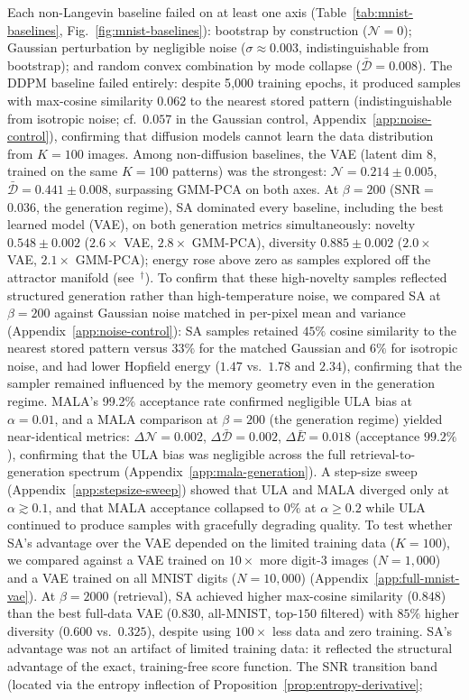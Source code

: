 Each non-Langevin baseline failed on at least one axis (Table~\ref{tab:mnist-baselines}, Fig.~\ref{fig:mnist-baselines}): bootstrap by construction ($\mathcal{N}{=}0$); Gaussian perturbation by negligible noise ($\sigma{\approx}0.003$, indistinguishable from bootstrap); and random convex combination by mode collapse ($\bar{\mathcal{D}}{=}0.008$). The DDPM baseline failed entirely: despite 5{,}000 training epochs, it produced samples with max-cosine similarity $0.062$ to the nearest stored pattern (indistinguishable from isotropic noise; cf.\ $0.057$ in the Gaussian control, Appendix~\ref{app:noise-control}), confirming that diffusion models cannot learn the data distribution from $K{=}100$ images. Among non-diffusion baselines, the VAE (latent dim 8, trained on the same $K{=}100$ patterns) was the strongest: $\mathcal{N}{=}0.214\pm0.005$, $\bar{\mathcal{D}}{=}0.441\pm0.008$, surpassing GMM-PCA on both axes. At $\beta{=}200$ (SNR$=$0.036, the generation regime), SA dominated every baseline, including the best learned model (VAE), on both generation metrics simultaneously: novelty $0.548\pm0.002$ ($2.6{\times}$ VAE, $2.8{\times}$ GMM-PCA), diversity $0.885\pm0.002$ ($2.0{\times}$ VAE, $2.1{\times}$ GMM-PCA); energy rose above zero as samples explored off the attractor manifold (see~$^\dagger$). To confirm that these high-novelty samples reflected structured generation rather than high-temperature noise, we compared SA at $\beta{=}200$ against Gaussian noise matched in per-pixel mean and variance (Appendix~\ref{app:noise-control}): SA samples retained $45\%$ cosine similarity to the nearest stored pattern versus $33\%$ for the matched Gaussian and $6\%$ for isotropic noise, and had lower Hopfield energy ($1.47$ vs.\ $1.78$ and $2.34$), confirming that the sampler remained influenced by the memory geometry even in the generation regime. MALA's 99.2\% acceptance rate confirmed negligible ULA bias at $\alpha{=}0.01$, and a MALA comparison at $\beta{=}200$ (the generation regime) yielded near-identical metrics: $\Delta\mathcal{N}{=}0.002$, $\Delta\bar{\mathcal{D}}{=}0.002$, $\Delta\bar{E}{=}0.018$ (acceptance $99.2\%$), confirming that the ULA bias was negligible across the full retrieval-to-generation spectrum (Appendix~\ref{app:mala-generation}). A step-size sweep (Appendix~\ref{app:stepsize-sweep}) showed that ULA and MALA diverged only at $\alpha{\gtrsim}0.1$, and that MALA acceptance collapsed to $0\%$ at $\alpha{\geq}0.2$ while ULA continued to produce samples with gracefully degrading quality. To test whether SA's advantage over the VAE depended on the limited training data ($K{=}100$), we compared against a VAE trained on $10{\times}$ more digit-3 images ($N{=}1{,}000$) and a VAE trained on all MNIST digits ($N{=}10{,}000$) (Appendix~\ref{app:full-mnist-vae}). At $\beta{=}2000$ (retrieval), SA achieved higher max-cosine similarity ($0.848$) than the best full-data VAE ($0.830$, all-MNIST, top-$150$ filtered) with $85\%$ higher diversity ($0.600$ vs.\ $0.325$), despite using $100{\times}$ less data and zero training. SA's advantage was not an artifact of limited training data: it reflected the structural advantage of the exact, training-free score function. The SNR transition band (located via the entropy inflection of Proposition~\ref{prop:entropy-derivative}; 